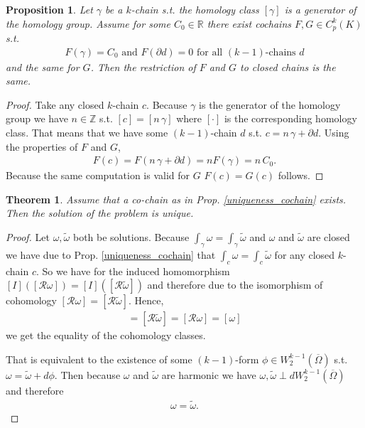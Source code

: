 \documentclass[12pt,a4paper]{article}
\newtheorem{proposition}{Proposition}
\newtheorem{theorem}{Theorem}
\theoremstyle{definition}
\newcommand{\omegabar}{\overline{\Omega}}
\newcommand{\real}{\mathbb{R}}
\newcommand{\rop}{\mathscr{R}} %
\begin{document}
\begin{proposition}
    Let $\gamma$ be a $k$-chain s.t. the homology class $[\gamma]$ 
    is a generator of the homology group. Assume for some $C_0 \in \real$ 
    there exist cochains $F,G \in C^k_p(K)$ s.t.
    \begin{align*}
    F(\gamma) = C_0 \text{ and } F(\partial d) = 0 
    \text{ for all } (k-1) \text{-chains } d
    \end{align*}
    and the same for $G$. Then the restriction of $F$ and $G$ to closed 
    chains is the same.
\end{proposition} \label{uniqueness_cochain}
\begin{proof}
    Take any closed $k$-chain $c$. Because $\gamma$ is the generator of the 
    homology group we have $n \in \mathbb{Z}$ s.t. $[c] = [n \, \gamma]$
    where $[\cdot]$ is the corresponding homology class. That means that we have
    some $(k-1)$-chain $d$ s.t. $c = n \, \gamma + \partial d$. Using the 
    properties of $F$ and $G$,
    \begin{align*}
        F(c) = F(n \, \gamma + \partial d) = n F(\gamma) = n \, C_0.
    \end{align*}
    Because the same computation is valid for $G$ $F(c) = G(c)$ follows.
\end{proof}

\begin{theorem}
    Assume that a co-chain as in Prop. \ref{uniqueness_cochain}  exists. 
    Then the solution of the problem is unique.
\end{theorem}
\begin{proof}
    Let $\omega, \tilde{\omega}$ both be solutions. 
    Because $\int_\gamma \omega = \int_\gamma \tilde{\omega}$ and $\omega$ and
    $\tilde{\omega}$ are closed we have due to Prop. \ref{uniqueness_cochain} %
    that $\int_c \omega = \int_c \tilde{\omega}$ for any closed $k$-chain $c$.
    So we have for the induced homomorphism $[I]([\rop \omega]) = 
    [I]([\rop \tilde{\omega}])$ and therefore due to the isomorphism of 
    cohomology $[\rop \omega] = [\rop \tilde{\omega}]$. Hence,
    \begin{align*}
    [\tilde{\omega}] = [\rop \tilde{\omega}] = 
    [\rop \omega] = [\omega]
    \end{align*}
    we get the equality of the cohomology classes. \par
    
    That is equivalent to the
    existence of some $(k-1)$-form $\phi \in W^{k-1}_2(\omegabar)$ s.t.
    $\omega = \tilde{\omega} + d\phi$. Then because $\omega$ and 
    $\tilde{\omega}$ are harmonic we have 
    $\omega, \tilde{\omega} \perp dW^{k-1}_2(\omegabar)$ and therefore 
    \begin{align*}
    \omega = \tilde{\omega}.
    \end{align*}
\end{proof}
\end{document}
